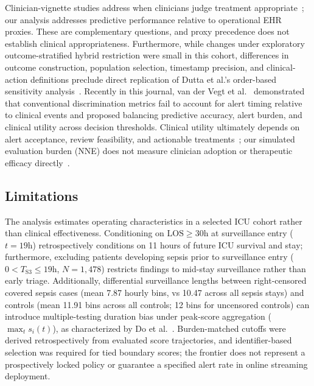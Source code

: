 \documentclass[10pt,twocolumn,a4paper]{article}
\begin{document}
Clinician-vignette studies address when clinicians judge treatment appropriate~\cite{weissman2024sepsis}; our analysis addresses predictive performance relative to operational EHR proxies. These are complementary questions, and proxy precedence does not establish clinical appropriateness. Furthermore, while changes under exploratory outcome-stratified hybrid restriction were small in this cohort, differences in outcome construction, population selection, timestamp precision, and clinical-action definitions preclude direct replication of Dutta et al.'s order-based sensitivity analysis~\cite{dutta2026performance}. Recently in this journal, van der Vegt et al.~\cite{vandervegt2026novel} demonstrated that conventional discrimination metrics fail to account for alert timing relative to clinical events and proposed balancing predictive accuracy, alert burden, and clinical utility across decision thresholds. Clinical utility ultimately depends on alert acceptance, review feasibility, and actionable treatments~\cite{ancker2017effects,henry2022factors}; our simulated evaluation burden (NNE) does not measure clinician adoption or therapeutic efficacy directly~\cite{paine2016systematic}.

\subsection{Limitations}
The analysis estimates operating characteristics in a selected ICU cohort rather than clinical effectiveness. Conditioning on $\text{LOS} \ge 30\text{h}$ at surveillance entry ($t=19\text{h}$) retrospectively conditions on 11 hours of future ICU survival and stay; furthermore, excluding patients developing sepsis prior to surveillance entry ($0 < T_{\text{S3}} \le 19\text{h}$, $N=1,478$) restricts findings to mid-stay surveillance rather than early triage. Additionally, differential surveillance lengths between right-censored covered sepsis cases (mean 7.87 hourly bins, vs 10.47 across all sepsis stays) and controls (mean 11.91 bins across all controls; 12 bins for uncensored controls) can introduce multiple-testing duration bias under peak-score aggregation ($\max_t s_i(t)$), as characterized by Do et al.~\cite{do2026continuous}. Burden-matched cutoffs were derived retrospectively from evaluated score trajectories, and identifier-based selection was required for tied boundary scores; the frontier does not represent a prospectively locked policy or guarantee a specified alert rate in online streaming deployment.
\end{document}
